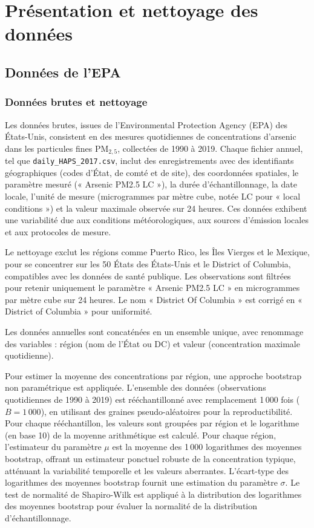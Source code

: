 \chapter{Présentation et nettoyage des données}
\label{chap:data}

\section{Données de l'EPA}

\subsection{Données brutes et nettoyage}

Les données brutes, issues de l'Environmental Protection Agency (EPA) \citep{epa_air_quality_system_2024} des États-Unis, consistent en des mesures quotidiennes de concentrations d'arsenic dans les particules fines PM$_{2,5}$, collectées de 1990 à 2019. Chaque fichier annuel, tel que \texttt{daily\_HAPS\_2017.csv}, inclut des enregistrements avec des identifiants géographiques (codes d'État, de comté et de site), des coordonnées spatiales, le paramètre mesuré (« Arsenic PM2.5 LC »), la durée d'échantillonnage, la date locale, l'unité de mesure (microgrammes par mètre cube, notée LC pour « local conditions ») et la valeur maximale observée sur 24 heures. Ces données exhibent une variabilité due aux conditions météorologiques, aux sources d'émission locales et aux protocoles de mesure.

Le nettoyage exclut les régions comme Puerto Rico, les Îles Vierges et le Mexique, pour se concentrer sur les 50 États des États-Unis et le District of Columbia, compatibles avec les données de santé publique. Les observations sont filtrées pour retenir uniquement le paramètre « Arsenic PM2.5 LC » en microgrammes par mètre cube sur 24 heures. Le nom « District Of Columbia » est corrigé en « District of Columbia » pour uniformité.

Les données annuelles sont concaténées en un ensemble unique, avec renommage des variables : région (nom de l'État ou DC) et valeur (concentration maximale quotidienne).

Pour estimer la moyenne des concentrations par région, une approche bootstrap non paramétrique est appliquée. L'ensemble des données (observations quotidiennes de 1990 à 2019) est rééchantillonné avec remplacement 1\,000 fois ($B = 1\,000$), en utilisant des graines pseudo-aléatoires pour la reproductibilité. Pour chaque rééchantillon, les valeurs sont groupées par région et le logarithme (en base 10) de la moyenne arithmétique est calculé. Pour chaque région, l'estimateur du paramètre $\mu$ est la moyenne des 1\,000 logarithmes des moyennes bootstrap, offrant un estimateur ponctuel robuste de la concentration typique, atténuant la variabilité temporelle et les valeurs aberrantes. L'écart-type des logarithmes des moyennes bootstrap fournit une estimation du paramètre $\sigma$. Le test de normalité de Shapiro-Wilk est appliqué à la distribution des logarithmes des moyennes bootstrap pour évaluer la normalité de la distribution d'échantillonnage.

